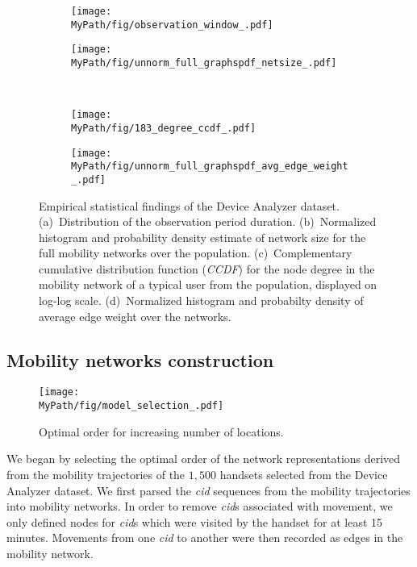 \begin{figure*}[!t]
	\centering
	\begin{subfigure}[!t]{0.47\textwidth}
		\centering		\texttt{[image: \\MyPath/fig/observation\_window\_.pdf]}
		\caption{}
		\label{fig:num_of_days}
	\end{subfigure}%
	\begin{subfigure}[!t]{.47\textwidth}
		\centering
		\texttt{[image: \\MyPath/fig/unnorm\_full\_graphspdf\_netsize\_.pdf]}
		\caption{}
		\label{fig:sizes}
	\end{subfigure}%
	\\
	\begin{subfigure}[!t]{0.47\textwidth}
		\centering
		\texttt{[image: \\MyPath/fig/183\_degree\_ccdf\_.pdf]}
		\caption{}
		\label{fig:ccdf}
	\end{subfigure}
	\begin{subfigure}[!t]{0.47\textwidth}
		\centering
		\texttt{[image: \\MyPath/fig/unnorm\_full\_graphspdf\_avg\_edge\_weight\_.pdf]}
		\caption{}
		\label{fig:avg_edge_weight}
	\end{subfigure}
	\caption{Empirical statistical findings of the Device Analyzer dataset. (a)~Distribution of the observation period duration. (b)~Normalized histogram and probability density estimate of network size for the full mobility networks over the population. (c)~Complementary cumulative distribution function (\emph{CCDF}) for the node degree in the mobility network of a typical user from the population, displayed on log-log scale. (d)~Normalized histogram and probabilty density of average edge weight over the networks.}
	\label{fig:eda}
\end{figure*}

\subsection{Mobility networks construction\label{sec:mobility-net-construct}}

\begin{figure*}[t]
	\centering
	\texttt{[image: \\MyPath/fig/model\_selection\_.pdf]}
	\caption{{Optimal order for increasing number of locations.}}
	\label{fig:model_selection}
\end{figure*}

We began by selecting the optimal order of the network representations derived from the mobility trajectories of the $1,500$ handsets selected from the Device Analyzer dataset.
We first parsed the \emph{cid} sequences from the mobility trajectories into mobility networks.
In order to remove \emph{cid}s associated with movement, we only defined nodes for \emph{cid}s which were visited by the handset for at least 15 minutes.
Movements from one \emph{cid} to another were then recorded as edges in the mobility network.

